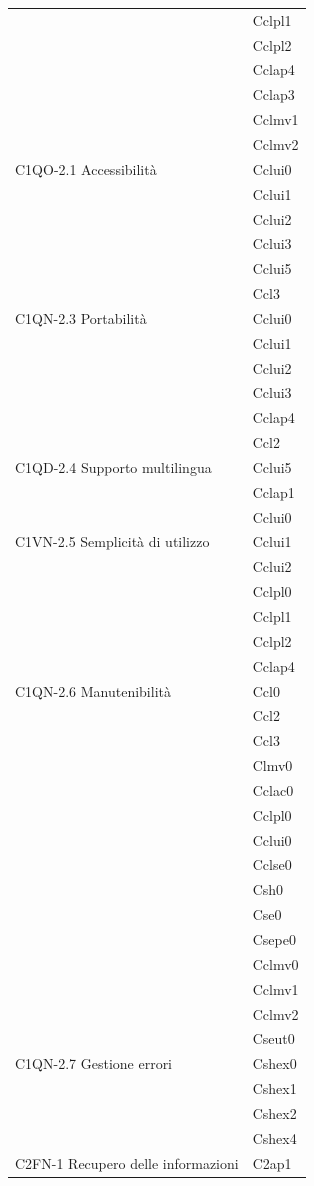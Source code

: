 \begin{footnotesize}
\begin{longtable}[!h]{|l|l|}
& Cclpl1\\
& Cclpl2\\
& Cclap4\\
& Cclap3\\
& Cclmv1\\
& Cclmv2\\\hline  
C1QO-2.1 Accessibilit\`a & Cclui0\\
& Cclui1\\
& Cclui2\\
& Cclui3\\
& Cclui5\\
& Ccl3\\\hline 
C1QN-2.3 Portabilit\`a & Cclui0\\
& Cclui1\\
& Cclui2\\
& Cclui3\\
& Cclap4\\
& Ccl2\\\hline   
C1QD-2.4 Supporto multilingua & Cclui5\\    
& Cclap1\\
& Cclui0\\\hline                
C1VN-2.5 Semplicit\`a di utilizzo & Cclui1\\
& Cclui2\\
& Cclpl0\\
& Cclpl1\\
& Cclpl2\\
& Cclap4\\\hline
C1QN-2.6 Manutenibilit\`a & Ccl0\\
& Ccl2\\
& Ccl3\\
& Clmv0\\
& Cclac0\\
& Cclpl0\\
& Cclui0\\
& Cclse0\\
& Csh0\\
& Cse0\\
& Csepe0\\
& Cclmv0\\
& Cclmv1\\
& Cclmv2\\
& Cseut0\\\hline                    
C1QN-2.7 Gestione errori  & Cshex0\\
& Cshex1\\
& Cshex2\\
& Cshex4\\\hline     
C2FN-1 Recupero delle informazioni & C2ap1 \\

\end{longtable}
\end{footnotesize}
